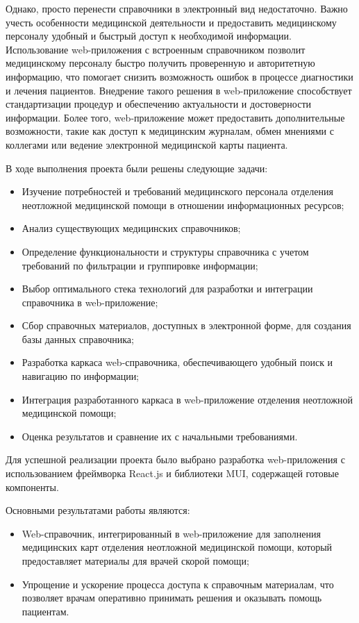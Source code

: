 Однако, просто перенести справочники в электронный вид недостаточно. Важно учесть особенности медицинской деятельности и предоставить медицинскому персоналу удобный и быстрый доступ к необходимой информации. Использование web-приложения с встроенным справочником позволит медицинскому персоналу быстро получить проверенную и авторитетную информацию, что помогает снизить возможность ошибок в процессе диагностики и лечения пациентов. Внедрение такого решения в web-приложение способствует стандартизации процедур и обеспечению актуальности и достоверности информации. Более того, web-приложение может предоставить дополнительные возможности, такие как доступ к медицинским журналам, обмен мнениями с коллегами или ведение электронной медицинской карты пациента.

В ходе выполнения проекта были решены следующие задачи:
\begin{itemize}
    \item Изучение потребностей и требований медицинского персонала отделения неотложной медицинской помощи в отношении информационных ресурсов;
    \item Анализ существующих медицинских справочников;
    \item Определение функциональности и структуры справочника с учетом требований по фильтрации и группировке информации;
    \item Выбор оптимального стека технологий для разработки и интеграции справочника в web-приложение;
    \item Сбор справочных материалов, доступных в электронной форме, для создания базы данных справочника;
    \item Разработка каркаса web-справочника, обеспечивающего удобный поиск и навигацию по информации;
    \item Интеграция разработанного каркаса в web-приложение отделения неотложной медицинской помощи;
    \item Оценка результатов и сравнение их с начальными требованиями.
\end{itemize}

Для успешной реализации проекта было выбрано разработка web-приложения с использованием фреймворка React.js и библиотеки MUI, содержащей готовые компоненты.

Основными результатами работы являются:
\begin{itemize}
    \item Web-справочник, интегрированный в web-приложение для заполнения медицинских карт отделения неотложной медицинской помощи, который предоставляет материалы для врачей скорой помощи;
    \item Упрощение и ускорение процесса доступа к справочным материалам, что позволяет врачам оперативно принимать решения и оказывать помощь пациентам.
\end{itemize}

